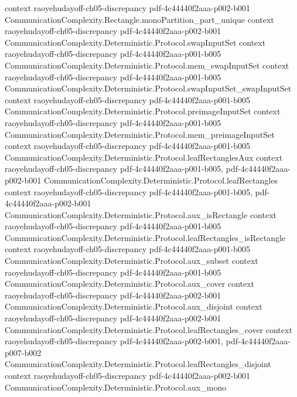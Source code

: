 \begin{theorem}
  {context}
  {raoyehudayoff-ch05-discrepancy}
  {pdf-4c44440f2aaa-p002-b001}
\proofstep
  {CommunicationComplexity.Rectangle.monoPartition_part_unique}
  {context}
  {raoyehudayoff-ch05-discrepancy}
  {pdf-4c44440f2aaa-p002-b001}
\proofstep
  {CommunicationComplexity.Deterministic.Protocol.swapInputSet}
  {context}
  {raoyehudayoff-ch05-discrepancy}
  {pdf-4c44440f2aaa-p001-b005}
\proofstep
  {CommunicationComplexity.Deterministic.Protocol.mem_swapInputSet}
  {context}
  {raoyehudayoff-ch05-discrepancy}
  {pdf-4c44440f2aaa-p001-b005}
\proofstep
  {CommunicationComplexity.Deterministic.Protocol.swapInputSet_swapInputSet}
  {context}
  {raoyehudayoff-ch05-discrepancy}
  {pdf-4c44440f2aaa-p001-b005}
\proofstep
  {CommunicationComplexity.Deterministic.Protocol.preimageInputSet}
  {context}
  {raoyehudayoff-ch05-discrepancy}
  {pdf-4c44440f2aaa-p001-b005}
\proofstep
  {CommunicationComplexity.Deterministic.Protocol.mem_preimageInputSet}
  {context}
  {raoyehudayoff-ch05-discrepancy}
  {pdf-4c44440f2aaa-p001-b005}
\proofstep
  {CommunicationComplexity.Deterministic.Protocol.leafRectanglesAux}
  {context}
  {raoyehudayoff-ch05-discrepancy}
  {pdf-4c44440f2aaa-p001-b005,
    pdf-4c44440f2aaa-p002-b001}
\proofstep
  {CommunicationComplexity.Deterministic.Protocol.leafRectangles}
  {context}
  {raoyehudayoff-ch05-discrepancy}
  {pdf-4c44440f2aaa-p001-b005,
    pdf-4c44440f2aaa-p002-b001}
\proofstep
  {CommunicationComplexity.Deterministic.Protocol.aux_isRectangle}
  {context}
  {raoyehudayoff-ch05-discrepancy}
  {pdf-4c44440f2aaa-p001-b005}
\proofstep
  {CommunicationComplexity.Deterministic.Protocol.leafRectangles_isRectangle}
  {context}
  {raoyehudayoff-ch05-discrepancy}
  {pdf-4c44440f2aaa-p001-b005}
\proofstep
  {CommunicationComplexity.Deterministic.Protocol.aux_subset}
  {context}
  {raoyehudayoff-ch05-discrepancy}
  {pdf-4c44440f2aaa-p001-b005}
\proofstep
  {CommunicationComplexity.Deterministic.Protocol.aux_cover}
  {context}
  {raoyehudayoff-ch05-discrepancy}
  {pdf-4c44440f2aaa-p002-b001}
\proofstep
  {CommunicationComplexity.Deterministic.Protocol.aux_disjoint}
  {context}
  {raoyehudayoff-ch05-discrepancy}
  {pdf-4c44440f2aaa-p002-b001}
\proofstep
  {CommunicationComplexity.Deterministic.Protocol.leafRectangles_cover}
  {context}
  {raoyehudayoff-ch05-discrepancy}
  {pdf-4c44440f2aaa-p002-b001,
    pdf-4c44440f2aaa-p007-b002}
\proofstep
  {CommunicationComplexity.Deterministic.Protocol.leafRectangles_disjoint}
  {context}
  {raoyehudayoff-ch05-discrepancy}
  {pdf-4c44440f2aaa-p002-b001}
\proofstep
  {CommunicationComplexity.Deterministic.Protocol.aux_mono}

\end{theorem}
